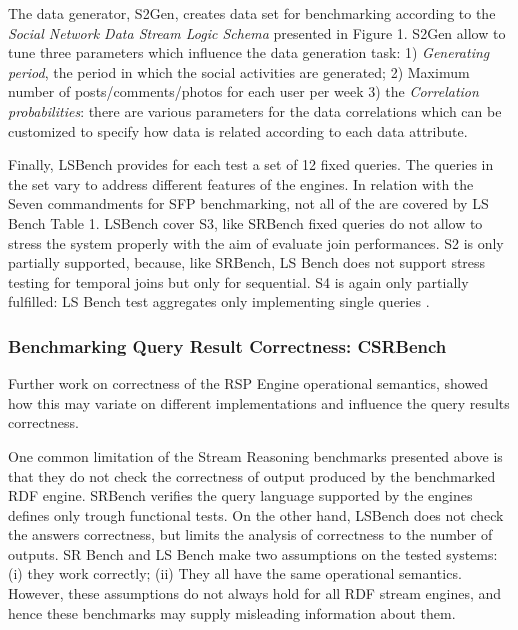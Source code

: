 
The data generator, S2Gen, creates data set for benchmarking according to the \textit{Social Network Data Stream Logic Schema} presented in \cite{LePhuoc2012c} Figure 1. S2Gen allow to tune three parameters which influence the data generation task: 1) \textit{Generating period}, the period in which the social activities are generated; 2) Maximum number of posts/comments/photos for each user per week 3) the \textit{Correlation probabilities}: there are various parameters for the data correlations which can be customized to specify how data is related according to each data attribute.

Finally, LSBench \cite{LePhuoc2012c} provides for each test a set of 12 fixed queries. The queries in the set vary to address different features of the engines. In relation with the Seven commandments for SFP benchmarking, not all of the are covered by LS Bench \cite{DBLP:conf/esws/ScharrenbachUMVB13} Table 1. LSBench cover S3, like SRBench fixed queries do not allow to stress the system properly with the aim of evaluate join performances. S2 is only partially supported, because, like SRBench, LS Bench does not support stress testing for temporal joins but only for sequential. S4 is again only partially fulfilled: LS Bench test aggregates only implementing single queries  \cite{DBLP:conf/esws/ScharrenbachUMVB13}.

\subsubsection{Benchmarking Query Result Correctness: CSRBench}

Further work on correctness of the RSP Engine operational semantics, showed how this may variate on different implementations and influence the query results correctness. \cite{DBLP:conf/semweb/DellAglioCBCV13}

One common limitation of the Stream Reasoning benchmarks presented above is that they do not check the correctness of output produced by the benchmarked RDF engine. SRBench verifies the query language supported by the engines defines only trough functional tests. On the other hand, LSBench does not check the answers correctness, but limits the analysis of correctness to the number of outputs. 
SR Bench and LS Bench make two assumptions on the tested systems: (i) they work correctly; (ii) They all have the same operational semantics. However, these assumptions do not always hold for all RDF stream engines, and hence these benchmarks may supply misleading information about them.
 
